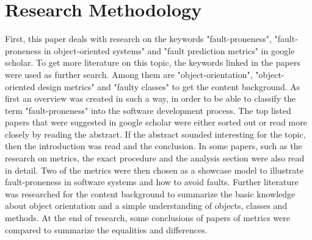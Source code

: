 \section{Research Methodology}\label{research}

First, this paper deals with research on the keywords "fault-proneness", "fault-proneness in object-oriented systems" and "fault prediction metrics" in google scholar. To get more literature on this topic, the keywords linked in the papers were used as further search. Among them are "object-orientation", "object-oriented design metrics" and "faulty classes" to get the content background. As first an overview was created in such a way, in order to be able to classify the term "fault-proneness" into the software development process. The top listed papers that were suggested in google scholar were either sorted out or read more closely by reading the abstract. If the abstract sounded interesting for the topic, then the introduction was read and the conclusion. In some papers, such as the research on metrics, the exact procedure and the analysis section were also read in detail. Two of the metrics were then chosen as a showcase model to illustrate fault-proneness in software systems and how to avoid faults. Further literature was researched for the content background to summarize the basic knowledge about object orientation and a simple understanding of objects, classes and methods. At the end of research, some conclusions of papers of metrics were compared to summarize the equalities and differences.



